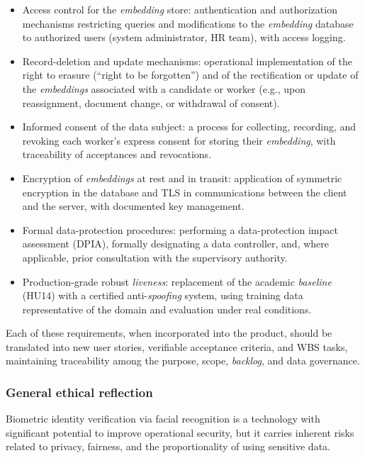 \documentclass[
  11pt, %
]{charter}
\begin{document}
\begin{itemize}
  \item Access control for the \textit{embedding} store: authentication and authorization mechanisms restricting queries and modifications to the \textit{embedding} database to authorized users (system administrator, HR team), with access logging.
  \item Record-deletion and update mechanisms: operational implementation of the right to erasure (``right to be forgotten'') and of the rectification or update of the \textit{embeddings} associated with a candidate or worker (e.g., upon reassignment, document change, or withdrawal of consent).
  \item Informed consent of the data subject: a process for collecting, recording, and revoking each worker's express consent for storing their \textit{embedding}, with traceability of acceptances and revocations.
  \item Encryption of \textit{embeddings} at rest and in transit: application of symmetric encryption in the database and TLS in communications between the client and the server, with documented key management.
  \item Formal data-protection procedures: performing a data-protection impact assessment (DPIA), formally designating a data controller, and, where applicable, prior consultation with the supervisory authority.
  \item Production-grade robust \textit{liveness}: replacement of the academic \textit{baseline} (HU14) with a certified anti-\textit{spoofing} system, using training data representative of the domain and evaluation under real conditions.
\end{itemize}

Each of these requirements, when incorporated into the product, should be translated into new user stories, verifiable acceptance criteria, and WBS tasks, maintaining traceability among the purpose, scope, \textit{backlog}, and data governance.

\subsubsection{General ethical reflection}

Biometric identity verification via facial recognition is a technology with significant potential to improve operational security, but it carries inherent risks related to privacy, fairness, and the proportionality of using sensitive data.
\end{document}
